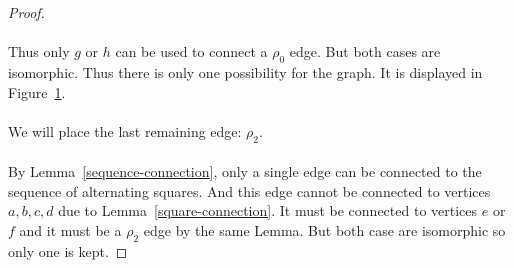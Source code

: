 \begin{proof}
\paragraph{}
Thus only $g$ or $h$ can be used to connect a $\rho_0$ edge. But both cases are isomorphic. Thus there is only one possibility for the graph. It is displayed in Figure~\ref{proof-5-4}.

\begin{figure}[H]
  \begin{center}
    \caption{}
    \label{proof-5-4}
  \end{center}
\end{figure}

\paragraph{}
We will place the last remaining edge: $\rho_2$.

\paragraph{}
By Lemma~\ref{sequence-connection}, only a single edge can be connected to the sequence of alternating squares. And this edge cannot be connected to vertices $a,b,c,d$ due to Lemma~\ref{square-connection}. It must be connected to vertices $e$ or $f$ and it must be a $\rho_2$ edge by the same Lemma. But both case are isomorphic so only one is kept.


\end{proof}
